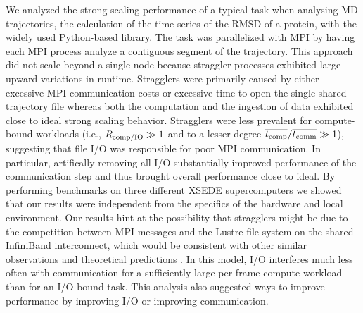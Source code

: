\label{sec:conclusions}

We analyzed the strong scaling performance of a typical task when analysing MD trajectories, the calculation of the time series of the RMSD of a protein, with the widely used Python-based  library.
The task was parallelized with MPI by having each MPI process analyze a contiguous segment of the trajectory.
This approach did not scale beyond a single node because straggler processes exhibited large upward variations in runtime.
Stragglers were primarily caused by either excessive MPI communication costs or excessive time to open the single shared trajectory file whereas both the computation and the ingestion of data exhibited close to ideal strong scaling behavior.
Stragglers were less prevalent for compute-bound workloads (i.e., $R_{\text{comp/IO}} \gg 1$ and to a lesser degree $\overline{{t}_{\text{comp}}}/\overline{t_{\text{comm}}} \gg 1$), suggesting that file I/O was responsible for poor MPI communication.
In particular, artifically removing all I/O substantially improved performance of the communication step and thus brought overall performance close to ideal.
By performing benchmarks on three different XSEDE supercomputers we showed that our results were independent from the specifics of the hardware and local environment.
Our results hint at the possibility that stragglers might be due to the competition between MPI messages and the Lustre file system on the shared InfiniBand interconnect, which would be consistent with other similar observations \cite{VMD2013, Kevin2018} and theoretical predictions \cite{Brown:2018ab}.
In this model, I/O interferes much less often with communication for a sufficiently large per-frame compute workload than for an I/O bound task.
This analysis also suggested ways to improve performance by improving I/O or improving communication.

